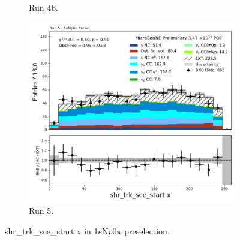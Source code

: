 \begin{figure}[H]
\begin{subfigure}[t]{0.32\linewidth}
        \caption{Run 4b.}
    \end{subfigure}%
    \hspace{0.2cm}%
    \begin{subfigure}[t]{0.32\linewidth}
        \includegraphics[width=\linewidth]{technote/Appendix_Preselection/Figures/1eNp0pi/Run5/shr_trk_sce_start_x_Run5_1eNp0pi_Presel.png}
        \caption{Run 5.}
    \end{subfigure}
    \caption{shr\_trk\_sce\_start x in 1$e$N$p$0$\pi$ preselection.}
\end{figure}


